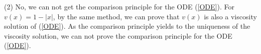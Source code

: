 \documentclass[12pt,a4paper]{ctexart}
\begin{document}
\vspace{4pt}

(2) No, we can not get the comparison principle for the ODE (\ref{ODE}). For $v(x) = 1 - |x|$, by the same method, we can prove that $v(x)$ is also a viscosity solution of (\ref{ODE}). As the comparison principle yields to the uniqueness of the viscosity solution, we can not prove the comparison principle for the ODE (\ref{ODE}).
\end{document}
